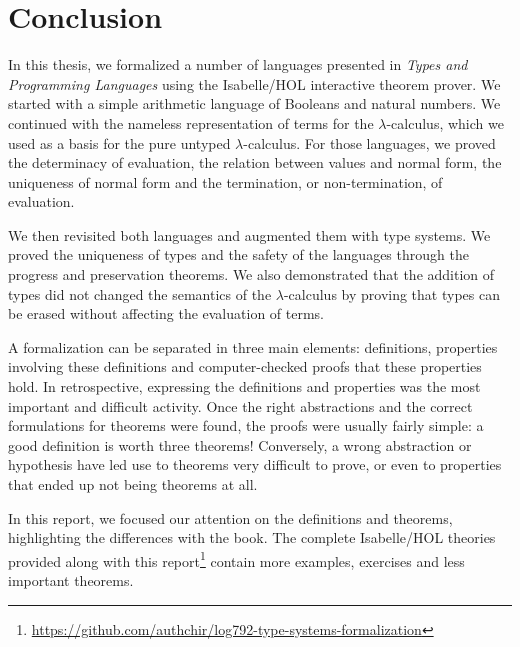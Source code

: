 \section{Conclusion}

In this thesis, we formalized a number of languages presented in \emph{Types and Programming
Languages} using the Isabelle/HOL interactive theorem prover. We started with a simple arithmetic
language of Booleans and natural numbers. We continued with the nameless representation of terms for
the $\lambda$-calculus, which we used as a basis for the pure untyped $\lambda$-calculus. For those
languages, we proved the determinacy of evaluation, the relation between values and normal form, the
uniqueness of normal form and the termination, or non-termination, of evaluation.

We then revisited both languages and augmented them with type systems. We proved the uniqueness of
types and the safety of the languages through the progress and preservation theorems. We also
demonstrated that the addition of types did not changed the semantics of the $\lambda$-calculus by
proving that types can be erased without affecting the evaluation of terms.

A formalization can be separated in three main elements: definitions, properties involving these
definitions and computer-checked proofs that these properties hold. In retrospective, expressing the
definitions and properties was the most important and difficult activity. Once the right
abstractions and the correct formulations for theorems were found, the proofs were usually fairly
simple: a good definition is worth three theorems! Conversely, a wrong abstraction or hypothesis
have led use to theorems very difficult to prove, or even to properties that ended up not being
theorems at all.

In this report, we focused our attention on the definitions and theorems, highlighting the
differences with the book. The complete Isabelle/HOL theories provided along with this
report\footnote{\url{https://github.com/authchir/log792-type-systems-formalization}} contain more
examples, exercises and less important theorems.
